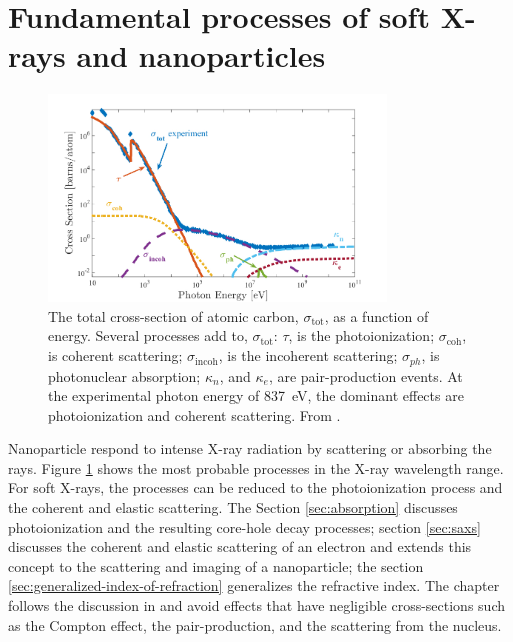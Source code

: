 \section{Fundamental processes of soft X-rays and nanoparticles}\label{sec:light-matter-interaction}
\begin{figure}
	\centering
		\includegraphics[width=0.80\textwidth]{images/absorption-cross-section-carbon-ken.jpg}
	\caption{The total cross-section of atomic carbon, $\sigma_{\text{tot}}$, as a function of energy. Several processes add to, $\sigma_{\text{tot}}$: $\tau$, is the photoionization; $\sigma_{\text{coh}}$, is coherent scattering; $\sigma_{\text{incoh}}$, is the incoherent scattering; $\sigma_{ph}$, is photonuclear absorption; $\kappa_{n}$, and $\kappa_{e}$, are pair-production events. At the experimental photon energy of \SI{837}{\electronvolt}, the dominant effects are photoionization and coherent scattering. From \citep{Ferguson-2016-PhD,Williams-2009-xb}.}
	\label{fig:absorption-cross-section-carbon-ken}
\end{figure}
%
Nanoparticle respond to intense X-ray radiation by scattering or absorbing the rays. Figure \ref{fig:absorption-cross-section-carbon-ken} shows the most probable processes in the X-ray wavelength range. For soft X-rays, the processes can be reduced to the photoionization process and the coherent and elastic scattering. The Section \ref{sec:absorption} discusses photoionization and the resulting core-hole decay processes; section \ref{sec:saxs} discusses the coherent and elastic scattering of an electron and extends this concept to the scattering and imaging of a nanoparticle; the section \ref{sec:generalized-index-of-refraction} generalizes the refractive index. The chapter follows the discussion in \citep{Als-Nielson-2011-JWS} and avoid effects that have negligible cross-sections such as the Compton effect, the pair-production, and the scattering from the nucleus.
